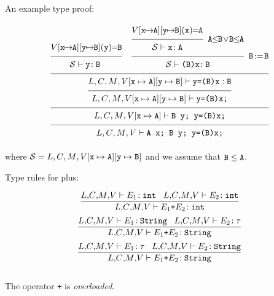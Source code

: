 \begin{slide*}
An example type proof:

\begin{scriptsize}
$$
\FRAC
{
\FRAC
{
\FRAC
{
{
\FRAC
{
\vars{}[\mbox{\tt x}\!\!\mapsto\!\!\mbox{\tt A}][\mbox{\tt y}\!\!\mapsto\!\!\mbox{\tt B}](\mbox{\tt y})\!\!=\!\!\mbox{\tt B}
}
{
{
{\cal S} \vdash \mbox{\tt y}\!: \mbox{\tt B}\
}
}
\;\;\;\;
\FRAC
{
\FRAC
{
\vars{}[\mbox{\tt x}\!\!\mapsto\!\!\mbox{\tt A}][\mbox{\tt y}\!\!\mapsto\!\!\mbox{\tt B}](\mbox{\tt x})\!\!=\!\!\mbox{\tt A}
}
{
{\cal S} \vdash \mbox{\tt x}\!: \mbox{\tt A}
}
\;\;
\mbox{\tt A}\!\!\leq\!\!\mbox{\tt B}\!\vee\!\mbox{\tt B}\!\!\leq\!\!\mbox{\tt A}
}
{
{\cal S} \vdash \mbox{\tt (B)x}\!: \mbox{\tt B}
}
\;\;
\mbox{\tt B}\!:=\!\mbox{\tt B}
}
}
{
\FRAC
{
\lib{},\class{},\method{},\vars{}[\mbox{\tt x} \mapsto \mbox{\tt A}]
[\mbox{\tt y} \mapsto \mbox{\tt B}] \vdash \mbox{\tt y=(B)x}: \mbox{\tt B}
}
{
\lib{},\class{},\method{},\vars{}[\mbox{\tt x} \mapsto \mbox{\tt A}]
[\mbox{\tt y} \mapsto \mbox{\tt B}] \vdash \mbox{\tt y=(B)x;}
}
}
}
{
\lib{},\class{},\method{},\vars{}[\mbox{\tt x} \mapsto \mbox{\tt A}]  \vdash
\mbox{\tt B y; y=(B)x;}
}
}
{
\lib{},\class{},\method{},\vars{} \vdash \mbox{\tt A x; B y; y=(B)x;}
}
$$
\end{scriptsize}

where ${\cal S} = \mbox{$L$}{},\mbox{$C$}{},\mbox{$M$}{},\mbox{$V$}{}[\mbox{\tt x} \mapsto \mbox{\tt A}]
[\mbox{\tt y} \mapsto \mbox{\tt B}]$ and we assume that $\mbox{\tt B}\leq\mbox{\tt A}$.
\vfil
\end{slide*}
 
\begin{slide*}
Type rules for plus:

$$ \frac{\lib{},\!\class{},\!\method{},\!\vars{} \vdash E_1\!: \mbox{\tt int}\;\;\;
         \lib{},\!\class{},\!\method{},\!\vars{} \vdash E_2\!: \mbox{\tt int}}{
         \lib{},\!\class{},\!\method{},\!\vars{} \vdash E_1 \mbox{\tt +} E_2\!: \mbox{\tt int}} $$
$$ \frac{\lib{},\!\class{},\!\method{},\!\vars{} \vdash E_1\!: \mbox{\tt String}\;\;\;
         \lib{},\!\class{},\!\method{},\!\vars{} \vdash E_2\!: \tau}{
         \lib{},\!\class{},\!\method{},\!\vars{} \vdash E_1 \mbox{\tt +} E_2\!: \mbox{\tt String}} $$
$$ \frac{\lib{},\!\class{},\!\method{},\!\vars{} \vdash E_1\!: \tau\;\;\;
         \lib{},\!\class{},\!\method{},\!\vars{} \vdash E_2\!: \mbox{\tt String}}{
         \lib{},\!\class{},\!\method{},\!\vars{} \vdash E_1 \mbox{\tt +} E_2\!: \mbox{\tt String}} $$
~\\

The operator {\tt +} is {\em overloaded}.
\vfil
\end{slide*}
 
